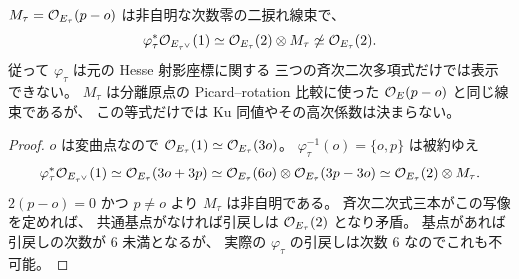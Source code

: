 \begin{corollary}
\label{ifj:cor:isogeny-picard-line}
$M_\tau=\mathcal O_{E_\tau}(p-o)$ は非自明な次数零の二捩れ線束で、
\begin{equation}\label{ifj:eq:isogeny-picard-pullback}
 \varphi_\tau^*\mathcal O_{E_{\tau^\vee}}(1)
   \simeq\mathcal O_{E_\tau}(2)\otimes M_\tau
   \not\simeq\mathcal O_{E_\tau}(2).
\end{equation}
従って $\varphi_\tau$ は元の Hesse 射影座標に関する
三つの斉次二次多項式だけでは表示できない。
$M_\tau$ は分離原点の Picard--rotation 比較に使った
$\mathcal O_E(p-o)$ と同じ線束であるが、
この等式だけでは Ku 同値やその高次係数は決まらない。
\end{corollary}

\begin{proof}
$o$ は変曲点なので $\mathcal O_{E_\tau}(1)\simeq\mathcal O_{E_\tau}(3o)$。
$\varphi_\tau^{-1}(o)=\{o,p\}$ は被約ゆえ
\[
 \varphi_\tau^*\mathcal O_{E_{\tau^\vee}}(1)
 \simeq\mathcal O_{E_\tau}(3o+3p)
 \simeq\mathcal O_{E_\tau}(6o)\otimes\mathcal O_{E_\tau}(3p-3o)
 \simeq\mathcal O_{E_\tau}(2)\otimes M_\tau.
\]
$2(p-o)=0$ かつ $p\ne o$ より $M_\tau$ は非自明である。
斉次二次式三本がこの写像を定めれば、
共通基点がなければ引戻しは $\mathcal O_{E_\tau}(2)$ となり矛盾。
基点があれば引戻しの次数が $6$ 未満となるが、
実際の $\varphi_\tau$ の引戻しは次数 $6$ なのでこれも不可能。
\end{proof}

